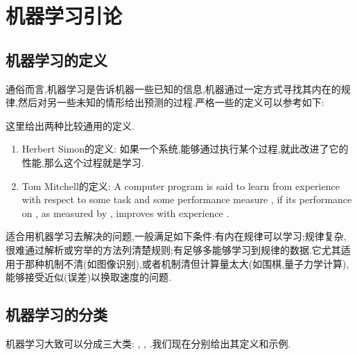 \documentclass{ctexart}
\begin{document}
\setcounter{FormalCounter}{0}
\section{机器学习引论}
\subsection{机器学习的定义}
通俗而言,机器学习是告诉机器一些已知的信息,机器通过一定方式寻找其内在的规律,然后对另一些未知的情形给出预测的过程.严格一些的定义可以参考如下:
\begin{definition}[机器学习的定义]
    这里给出两种比较通用的定义.
    \begin{enumerate}[label=\tbf{\arabic*.},topsep=0pt,parsep=0pt,itemsep=0pt,partopsep=0pt]
        \item Herbert Simon的定义: 如果一个系统,能够通过执行某个过程,就此改进了它的性能,那么这个过程就是学习.
        \item Tom Mitchell的定义: A computer program is said to learn from experience  with respect to some task  and some performance measure , if its performance on , as measured by , improves with experience .
    \end{enumerate}
\end{definition}
适合用机器学习去解决的问题,一般满足如下条件:有内在规律可以学习;规律复杂,很难通过解析或穷举的方法列清楚规则;有足够多能够学习到规律的数据.它尤其适用于那种机制不清(如图像识别),或者机制清但计算量太大(如围棋,量子力学计算),能够接受近似(误差)以换取速度的问题.
\subsection{机器学习的分类}
机器学习大致可以分成三大类: , , .我们现在分别给出其定义和示例.
\end{document}
